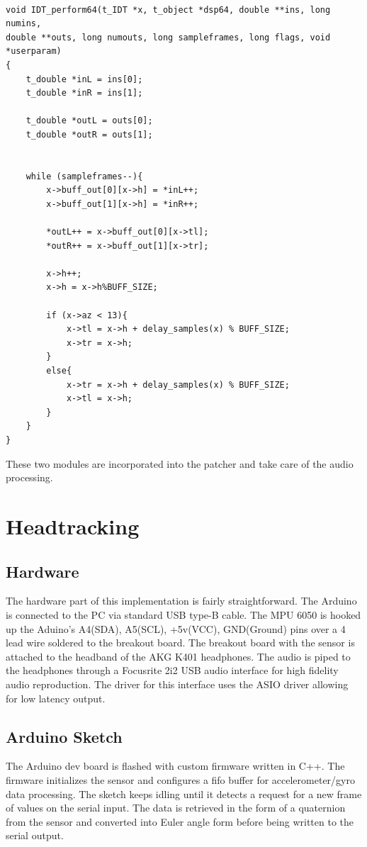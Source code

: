 \documentclass[a4paper,12pt,oneside]{article}
\begin{document}
\begin{verbatim}

void IDT_perform64(t_IDT *x, t_object *dsp64, double **ins, long numins, 
double **outs, long numouts, long sampleframes, long flags, void *userparam)
{
	t_double *inL = ins[0];
	t_double *inR = ins[1];

	t_double *outL = outs[0];
	t_double *outR = outs[1];	

	
	while (sampleframes--){
		x->buff_out[0][x->h] = *inL++;
		x->buff_out[1][x->h] = *inR++;

		*outL++ = x->buff_out[0][x->tl];
		*outR++ = x->buff_out[1][x->tr];

		x->h++;
		x->h = x->h%BUFF_SIZE;

		if (x->az < 13){
			x->tl = x->h + delay_samples(x) % BUFF_SIZE;
			x->tr = x->h;
		}	
		else{
			x->tr = x->h + delay_samples(x) % BUFF_SIZE;
			x->tl = x->h;
		}
	}
}

\end{verbatim}

These two modules are incorporated into the patcher and take care of the audio processing.

\section*{Headtracking}


\subsection{Hardware}

The hardware part of this implementation is fairly straightforward. The Arduino is connected to the PC via standard USB type-B cable. The MPU 6050 is hooked up the Aduino's A4(SDA), A5(SCL), +5v(VCC), GND(Ground) pins over a 4 lead wire soldered to the breakout board. The breakout board with the sensor is attached to the headband of the AKG K401 headphones. The audio is piped to the headphones through a Focusrite 2i2 USB audio interface for high fidelity audio reproduction. The driver for this interface uses the ASIO driver allowing for low latency output.

\subsection{Arduino Sketch}

The Arduino dev board is flashed with custom firmware written in C++. The firmware initializes the sensor and configures a fifo buffer for accelerometer/gyro data processing. The sketch keeps idling until it detects a request for a new frame of values on the serial input. The data is retrieved in the form of a quaternion from the sensor and converted into Euler angle form before being written to the serial output.\\
\end{document}
